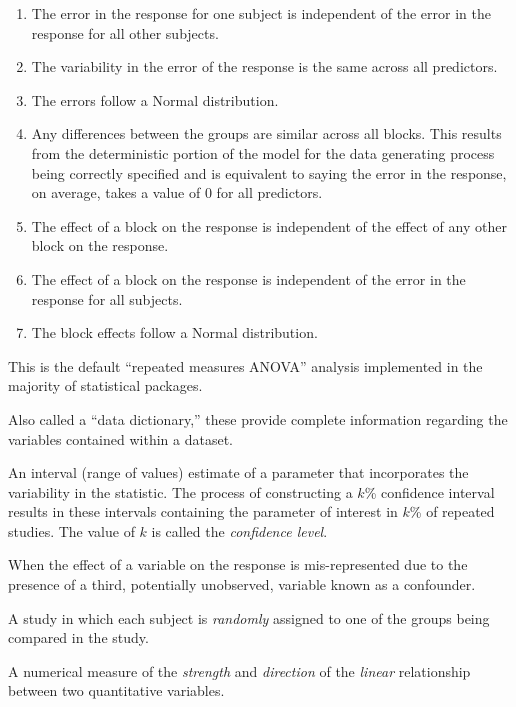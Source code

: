 \documentclass[
  letterpaper,
  DIV=11,
  numbers=noendperiod]{scrreprt}
\providecommand{\tightlist}{%
  \setlength{\itemsep}{0pt}\setlength{\parskip}{0pt}}\usepackage{longtable,booktabs,array}
\theoremstyle{plain}
\theoremstyle{definition}
\theoremstyle{definition}
\theoremstyle{remark}
\begin{document}
\begin{enumerate}
\def\labelenumi{\arabic{enumi}.}
\tightlist
\item
  The error in the response for one subject is independent of the error
  in the response for all other subjects.
\item
  The variability in the error of the response is the same across all
  predictors.
\item
  The errors follow a Normal distribution.
\item
  Any differences between the groups are similar across all blocks. This
  results from the deterministic portion of the model for the data
  generating process being correctly specified and is equivalent to
  saying the error in the response, on average, takes a value of 0 for
  all predictors.
\item
  The effect of a block on the response is independent of the effect of
  any other block on the response.
\item
  The effect of a block on the response is independent of the error in
  the response for all subjects.
\item
  The block effects follow a Normal distribution.
\end{enumerate}

This is the default ``repeated measures ANOVA'' analysis implemented in
the majority of statistical packages.

\begin{description}
\tightlist
\item[Codebook (Definition~\ref{def-codebook})]
Also called a ``data dictionary,'' these provide complete information
regarding the variables contained within a dataset.
\item[Confidence Interval (Definition~\ref{def-confidence-interval})]
An interval (range of values) estimate of a parameter that incorporates
the variability in the statistic. The process of constructing a \(k\)\%
confidence interval results in these intervals containing the parameter
of interest in \(k\)\% of repeated studies. The value of \(k\) is called
the \emph{confidence level}.
\item[Confounding (Definition~\ref{def-confounding})]
When the effect of a variable on the response is mis-represented due to
the presence of a third, potentially unobserved, variable known as a
confounder.
\item[Controlled Experiment
(Definition~\ref{def-controlled-experiment})]
A study in which each subject is \emph{randomly} assigned to one of the
groups being compared in the study.
\item[Correlation Coefficient
(Definition~\ref{def-correlation-coefficient})]
A numerical measure of the \emph{strength} and \emph{direction} of the
\emph{linear} relationship between two quantitative variables.
\end{description}
\end{document}
